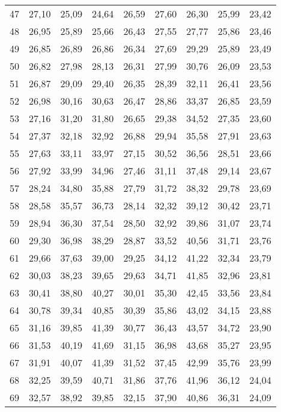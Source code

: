 \begin{longtable}{c c c c c c c c c}
      47	& 27,10	& 25,09	& 24,64	& 26,59	& 27,60	& 26,30	& 25,99	& 23,42 \\
      48	& 26,95	& 25,89	& 25,66	& 26,43	& 27,55	& 27,77	& 25,86	& 23,46 \\
      49	& 26,85	& 26,89	& 26,86	& 26,34	& 27,69	& 29,29	& 25,89	& 23,49 \\
      50	& 26,82	& 27,98	& 28,13	& 26,31	& 27,99	& 30,76	& 26,09	& 23,53 \\
      51	& 26,87	& 29,09	& 29,40	& 26,35	& 28,39	& 32,11	& 26,41	& 23,56 \\
      52	& 26,98	& 30,16	& 30,63	& 26,47	& 28,86	& 33,37	& 26,85	& 23,59 \\
      53	& 27,16	& 31,20	& 31,80	& 26,65	& 29,38	& 34,52	& 27,35	& 23,60 \\
      54	& 27,37	& 32,18	& 32,92	& 26,88	& 29,94	& 35,58	& 27,91	& 23,63 \\
      55	& 27,63	& 33,11	& 33,97	& 27,15	& 30,52	& 36,56	& 28,51	& 23,66 \\
      56	& 27,92	& 33,99	& 34,96	& 27,46	& 31,11	& 37,48	& 29,14	& 23,67 \\
      57	& 28,24	& 34,80	& 35,88	& 27,79	& 31,72	& 38,32	& 29,78	& 23,69 \\
      58	& 28,58	& 35,57	& 36,73	& 28,14	& 32,32	& 39,12	& 30,42	& 23,71 \\
      59	& 28,94	& 36,30	& 37,54	& 28,50	& 32,92	& 39,86	& 31,07	& 23,74 \\
      60	& 29,30	& 36,98	& 38,29	& 28,87	& 33,52	& 40,56	& 31,71	& 23,76 \\
      61	& 29,66	& 37,63	& 39,00	& 29,25	& 34,12	& 41,22	& 32,34	& 23,79 \\
      62	& 30,03	& 38,23	& 39,65	& 29,63	& 34,71	& 41,85	& 32,96	& 23,81 \\
      63	& 30,41	& 38,80	& 40,27	& 30,01	& 35,30	& 42,45	& 33,56	& 23,84 \\
      64	& 30,78	& 39,34	& 40,85	& 30,39	& 35,86	& 43,02	& 34,15	& 23,88 \\
      65	& 31,16	& 39,85	& 41,39	& 30,77	& 36,43	& 43,57	& 34,72	& 23,90 \\
      66	& 31,53	& 40,19	& 41,69	& 31,15	& 36,98	& 43,68	& 35,27	& 23,95 \\
      67	& 31,91	& 40,07	& 41,39	& 31,52	& 37,45	& 42,99	& 35,76	& 23,99 \\
      68	& 32,25	& 39,59	& 40,71	& 31,86	& 37,76	& 41,96	& 36,12	& 24,04 \\
      69	& 32,57	& 38,92	& 39,85	& 32,15	& 37,90	& 40,86	& 36,31	& 24,09 \\

\end{longtable}
